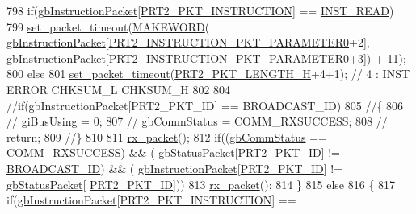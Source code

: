 \begin{DoxyCode}
798         \textcolor{keywordflow}{if}(\hyperlink{classdynamixel2_a298efe9115fdbf77019af1001e801fb4}{gbInstructionPacket}[\hyperlink{dynamixel_8h_aece9dd9d7c0fa1714d53c568865d79ad}{PRT2\_PKT\_INSTRUCTION}] == 
      \hyperlink{dynamixel_8h_a60599b6587736bb05efb8ea3c5e5f87f}{INST\_READ})
799             \hyperlink{classdynamixel2_a132d723a321ba225f75f2c79e5d4d27b}{set\_packet\_timeout}(\hyperlink{dynamixel_8h_a6b98c16b8e3e7733dd4063d0b0fac24c}{MAKEWORD}(
      \hyperlink{classdynamixel2_a298efe9115fdbf77019af1001e801fb4}{gbInstructionPacket}[\hyperlink{dynamixel_8h_a349ccb89ae957bdcc16856ec8e2dcb00}{PRT2\_INSTRUCTION\_PKT\_PARAMETER0}+2], 
      \hyperlink{classdynamixel2_a298efe9115fdbf77019af1001e801fb4}{gbInstructionPacket}[\hyperlink{dynamixel_8h_a349ccb89ae957bdcc16856ec8e2dcb00}{PRT2\_INSTRUCTION\_PKT\_PARAMETER0}+3]) +
       11);
800         \textcolor{keywordflow}{else}
801             \hyperlink{classdynamixel2_a132d723a321ba225f75f2c79e5d4d27b}{set\_packet\_timeout}(\hyperlink{dynamixel_8h_a5ea18a21d722bf72217d5408c4d2a868}{PRT2\_PKT\_LENGTH\_H}+4+1);    \textcolor{comment}{// 4 : INST
       ERROR CHKSUM\_L CHKSUM\_H}
802 
804         \textcolor{comment}{//if(gbInstructionPacket[PRT2\_PKT\_ID] == BROADCAST\_ID)}
805         \textcolor{comment}{//\{}
806         \textcolor{comment}{//  giBusUsing = 0;}
807         \textcolor{comment}{//  gbCommStatus = COMM\_RXSUCCESS;}
808         \textcolor{comment}{//  return;}
809         \textcolor{comment}{//\}}
810 
811         \hyperlink{classdynamixel2_a7ca03821f030981263c55f2ae2786c4c}{rx\_packet}();
812         \textcolor{keywordflow}{if}((\hyperlink{classdynamixel2_a703e327ba8ec5909c238dc94a00cb32d}{gbCommStatus} == \hyperlink{dynamixel_8h_a171328d9f298535c18d079f65e631434}{COMM\_RXSUCCESS}) && (
      \hyperlink{classdynamixel2_a0776f210a190cf57d1a6faf9697a593d}{gbStatusPacket}[\hyperlink{dynamixel_8h_a3524b007f8f56ad0d80c1d0caf7e968a}{PRT2\_PKT\_ID}] != \hyperlink{dynamixel_8h_ab9fe47395310b34fa1ceb112c9ca10e2}{BROADCAST\_ID}) && (
      \hyperlink{classdynamixel2_a298efe9115fdbf77019af1001e801fb4}{gbInstructionPacket}[\hyperlink{dynamixel_8h_a3524b007f8f56ad0d80c1d0caf7e968a}{PRT2\_PKT\_ID}] != \hyperlink{classdynamixel2_a0776f210a190cf57d1a6faf9697a593d}{gbStatusPacket}[
      \hyperlink{dynamixel_8h_a3524b007f8f56ad0d80c1d0caf7e968a}{PRT2\_PKT\_ID}]))
813             \hyperlink{classdynamixel2_a7ca03821f030981263c55f2ae2786c4c}{rx\_packet}();
814     \}
815     \textcolor{keywordflow}{else}
816     \{
817         \textcolor{keywordflow}{if}(\hyperlink{classdynamixel2_a298efe9115fdbf77019af1001e801fb4}{gbInstructionPacket}[\hyperlink{dynamixel_8h_aece9dd9d7c0fa1714d53c568865d79ad}{PRT2\_PKT\_INSTRUCTION}] == 

\end{DoxyCode}

